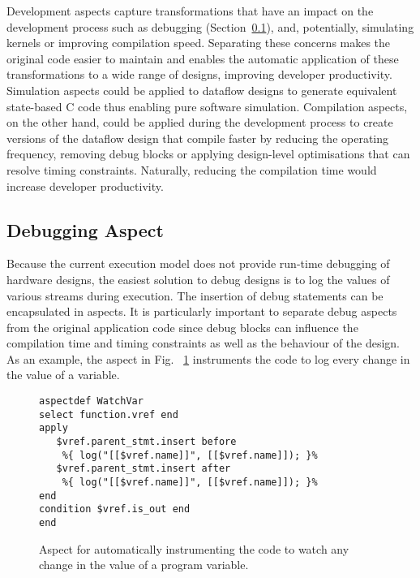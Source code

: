Development aspects capture transformations that have an impact on the
development process such as debugging (Section~\ref{sect:asp_debug}),
and, potentially, simulating kernels or improving compilation
speed. Separating these concerns makes the original code easier to
maintain and enables the automatic application of these
transformations to a wide range of designs, improving developer
productivity. Simulation aspects could be applied to dataflow designs
to generate equivalent state-based C code thus enabling pure software
simulation. Compilation aspects, on the other hand, could be applied
during the development process to create versions of the dataflow
design that compile faster by reducing the operating frequency,
removing debug blocks or applying design-level optimisations that can
resolve timing constraints. Naturally, reducing the compilation time
would increase developer productivity.












\subsection{Debugging Aspect}
\label{sect:asp_debug}
Because the current execution model does not provide run-time debugging
of hardware designs, the easiest solution to debug designs is to log
the values of various streams during execution. The insertion of debug
statements can be encapsulated in aspects. It is particularly
important to separate debug aspects from the original application code
since debug blocks can influence the compilation time and timing
constraints as well as the behaviour of the design. As an example,
the aspect in Fig. ~\ref{fig:aspect-debug} instruments the code to log every change in the value of a variable.

\lstset{style=lara}
\begin{figure}[!h]
  \centering
\begin{lstlisting}
aspectdef WatchVar
select function.vref end
apply
   $vref.parent_stmt.insert before
    %{ log("[[$vref.name]]", [[$vref.name]]); }%
   $vref.parent_stmt.insert after
    %{ log("[[$vref.name]]", [[$vref.name]]); }%
end
condition $vref.is_out end
end
\end{lstlisting}
  \caption{Aspect for automatically instrumenting the code to watch any change in the value of a program variable.}
  \label{fig:aspect-debug}
\end{figure}


